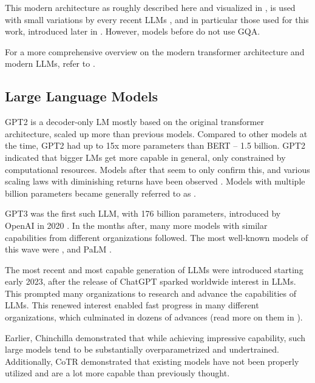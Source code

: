 

This modern architecture as roughly described here and visualized in , is used with small variations by every recent \glspl{LLM} \cite{naveed_comprehensive_2023}, and in particular those used for this work, introduced later in .
However, models before  do not use \gls{GQA}.

For a more comprehensive overview on the modern transformer architecture and modern \glspl{LLM}, refer to \cite{naveed_comprehensive_2023}.

\subsection{Large Language Models}\label{sub:llm}

\gls{GPT2} \cite{radford_language_2019} is a decoder-only \gls{LM} mostly based on the original transformer architecture, scaled up more than previous models.
Compared to other models at the time, \gls{GPT2} had up to 15x more parameters than \gls{BERT} -- 1.5 billion.
\gls{GPT2} indicated that bigger \glspl{LM} get more capable in general, only constrained by computational resources.
Models after that seem to only confirm this, and various scaling laws with diminishing returns have been observed \cite{rae_scaling_2022, hoffmann_training_2022}.
Models with multiple billion parameters became generally referred to as .

\gls{GPT3} was the first such \gls{LLM}, with 176 billion parameters, introduced by \gls{OpenAI} in 2020 \cite{brown_language_2020}.
In the months after, many more models with similar capabilities from different organizations followed.
The most well-known models of this wave were ,  and \gls{PaLM} \cite{chowdhery_palm_2022}.


The most recent and most capable generation of \glspl{LLM} were introduced starting early 2023, after the release of \gls{ChatGPT} sparked worldwide interest in \glspl{LLM}.
This prompted many organizations to research and advance the capabilities of \glspl{LLM}.
This renewed interest enabled fast progress in many different organizations, which culminated in dozens of advances (read more on them in ).

Earlier, Chinchilla \cite{hoffmann_training_2022} demonstrated that while achieving impressive capability, such large models tend to be substantially overparametrized and undertrained.
Additionally, CoTR \cite{zhang_multimodal_2023} demonstrated that existing models have not been properly utilized and are a lot more capable than previously thought.


